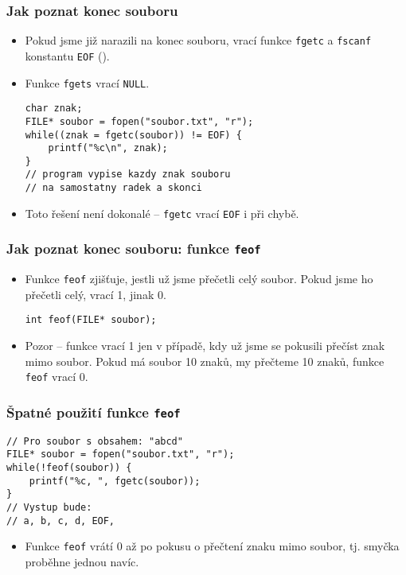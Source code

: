 \documentclass{beamer}
\newenvironment{itemizex}%
  {\large \begin{itemize}%
    \setlength{\itemsep}{8pt}%
    \setlength{\parskip}{8pt}}%
  {\end{itemize}}
\begin{document}
\begin{frame}[t,fragile]\frametitle{Jak poznat konec souboru} 
    \begin{itemizex}
        \item Pokud jsme již narazili na konec souboru, vrací funkce \texttt{fgetc} a \texttt{fscanf} konstantu \texttt{EOF} ().
        \item Funkce \texttt{fgets} vrací \texttt{NULL}.
\begin{verbatim} 
char znak;
FILE* soubor = fopen("soubor.txt", "r");
while((znak = fgetc(soubor)) != EOF) {
    printf("%c\n", znak);
}
// program vypise kazdy znak souboru 
// na samostatny radek a skonci
\end{verbatim}
        \item Toto řešení není dokonalé -- \texttt{fgetc} vrací \texttt{EOF} i při chybě.
    \end{itemizex}
\end{frame}


\begin{frame}[t,fragile]\frametitle{Jak poznat konec souboru: funkce \texttt{feof}} 
    \begin{itemizex}
        \item Funkce \texttt{feof} zjišťuje, jestli už jsme přečetli celý soubor. Pokud jsme ho přečetli celý, vrací 1, jinak 0. 
\begin{verbatim} 
int feof(FILE* soubor);
\end{verbatim}
        \item Pozor -- funkce vrací 1 jen v případě, kdy už jsme se pokusili přečíst znak mimo soubor. Pokud má soubor 10 znaků, my přečteme 10 znaků, funkce \texttt{feof} vrací 0.
    \end{itemizex}
\end{frame}


\begin{frame}[t,fragile]\frametitle{Špatné použití funkce \texttt{feof}} 
\begin{verbatim} 
// Pro soubor s obsahem: "abcd"
FILE* soubor = fopen("soubor.txt", "r");
while(!feof(soubor)) {
    printf("%c, ", fgetc(soubor));
}
// Vystup bude:
// a, b, c, d, EOF, 
\end{verbatim}
\begin{itemizex}
    \item Funkce \texttt{feof} vrátí 0 až po pokusu o přečtení znaku mimo soubor, tj. smyčka proběhne jednou navíc. 
\end{itemizex}
\end{frame}
\end{document}
